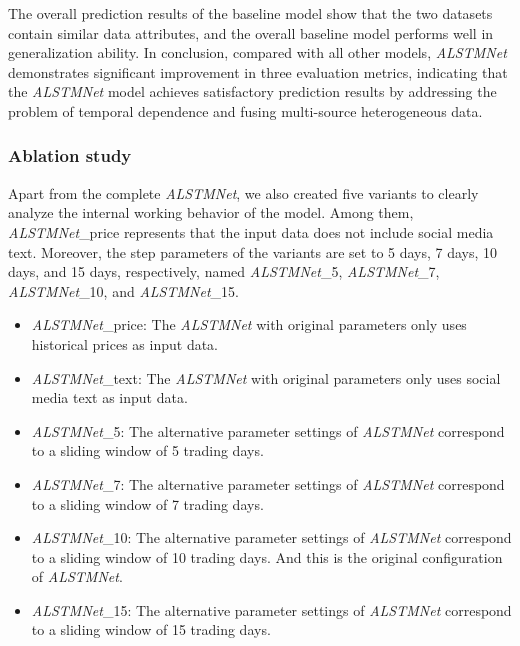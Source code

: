 \documentclass[sn-mathphys]{sn-jnl}%
\theoremstyle{thmstyleone}%
\theoremstyle{thmstyletwo}%
\theoremstyle{thmstylethree}%
\begin{document}
The overall prediction results of the baseline model show that the two datasets contain similar data attributes, and the overall baseline model performs well in generalization ability. In conclusion, compared with all other models, {\it ALSTMNet} demonstrates significant improvement in three evaluation metrics, indicating that the {\it ALSTMNet} model achieves satisfactory prediction results by addressing the problem of temporal dependence and fusing multi-source heterogeneous data.

\subsubsection{Ablation study}\label{Ablation study}
Apart from the complete {\it ALSTMNet}, we also created five variants to clearly analyze the internal working behavior of the model. Among them, {\it ALSTMNet}\_price represents that the input data does not include social media text. Moreover, the step parameters of the variants are set to 5 days, 7 days, 10 days, and 15 days, respectively, named {\it ALSTMNet}\_5, {\it ALSTMNet}\_7, {\it ALSTMNet}\_10, and {\it ALSTMNet}\_15.

\begin{itemize}
	\item {\it ALSTMNet}\_price: The {\it ALSTMNet} with original parameters only uses historical prices as input data.
	\item {\it ALSTMNet}\_text: The {\it ALSTMNet} with original parameters only uses social media text as input data.
	\item {\it ALSTMNet}\_5: The alternative parameter settings of {\it ALSTMNet} correspond to a sliding window of 5 trading days.
	\item {\it ALSTMNet}\_7: The alternative parameter settings of {\it ALSTMNet} correspond to a sliding window of 7 trading days.
	\item {\it ALSTMNet}\_10: The alternative parameter settings of {\it ALSTMNet} correspond to a sliding window of 10 trading days. And this is the original configuration of {\it ALSTMNet}.
	\item {\it ALSTMNet}\_15: The alternative parameter settings of {\it ALSTMNet} correspond to a sliding window of 15 trading days.
\end{itemize}
\end{document}
